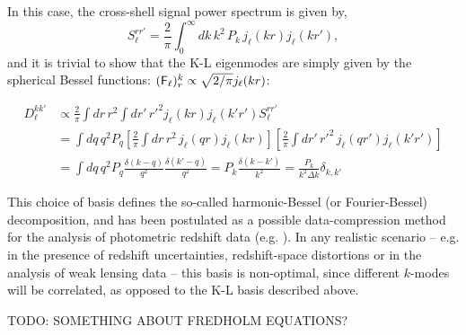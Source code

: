\documentclass[twocolumn,amsfont,amssymb,amsmath, showpacs,balancelastpage, nofootinbib]{revtex4-1}
\begin{document}
    In this case, the cross-shell signal power spectrum is given by,
    \begin{equation}
      S_\ell^{rr'}=\frac{2}{\pi}\int_0^\infty dk\,k^2\,P_k\,j_\ell(kr)j_\ell(kr'),
    \end{equation}
    and it is trivial to show that the K-L eigenmodes are simply given by the spherical Bessel functions: $({\sf F}_\ell)^k_r\propto \sqrt{2/\pi}j_\ell(kr)$:
    \begin{widetext}
    \begin{align}
      D_\ell^{kk'}&\propto\frac{2}{\pi}\int dr\,r^2\int dr'\,r'^2 j_\ell(kr)j_\ell(k'r') S_\ell^{rr'}\\
      &=\int dq\,q^2P_q\left[\frac{2}{\pi}\int dr\,r^2\,j_\ell(qr)j_\ell(kr)\right]\left[\frac{2}{\pi}\int dr'\,r'^2\,j_\ell(qr')j_\ell(k'r')\right]\\
      &=\int dq\,q^2P_q\frac{\delta(k-q)}{q^2}\frac{\delta(k'-q)}{q^2}=P_k\frac{\delta(k-k')}{k^2}=\frac{P_k}{k^2\Delta k}\delta_{k,k'}
    \end{align}
    \end{widetext}
   
    This choice of basis defines the so-called harmonic-Bessel (or Fourier-Bessel) decomposition, and has been postulated as a possible data-compression method for the analysis of photometric redshift data (e.g. \cite{2014MNRAS.442.1326K}). In any realistic scenario -- e.g. in the presence of redshift uncertainties, redshift-space distortions or in the analysis of weak lensing data -- this basis is non-optimal, since different $k$-modes will be correlated, as opposed to the K-L basis described above.

    TODO: SOMETHING ABOUT FREDHOLM EQUATIONS?
\end{document}

